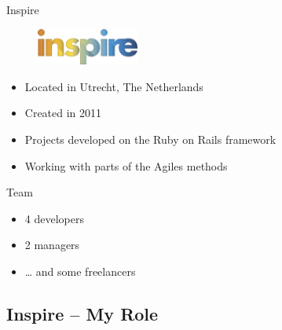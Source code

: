 \documentclass[10pt,a4paper]{beamer}
\begin{document}
\begin{frame}{Inspire}

  \begin{figure}[htp]
  \centering
  \includegraphics[width=0.3\textwidth]{../img/logo.png}
  \end{figure}

  \begin{itemize}
    \item Located in Utrecht, The Netherlands
    \item Created in 2011
    \item Projects developed on the Ruby on Rails framework
    \item Working with parts of the Agiles methods
  \end{itemize}
  
  \begin{block}{Team}
    \begin{itemize}
      \item 4 developers
      \item 2 managers
      \item … and some freelancers
    \end{itemize}
  \end{block}
\end{frame}

\subsection{Inspire -- My Role}
\end{document}
